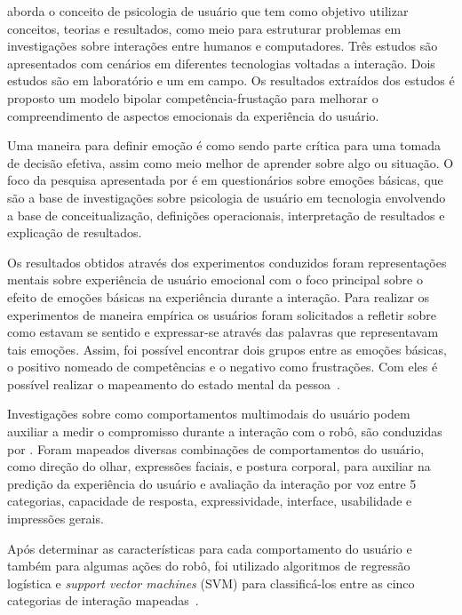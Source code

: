  aborda o conceito de psicologia de usuário que tem como objetivo utilizar conceitos, teorias e resultados, como meio para estruturar problemas em investigações sobre interações entre humanos e computadores. Três estudos são apresentados com cenários em diferentes tecnologias voltadas a interação. Dois estudos são em laboratório e um em campo. Os resultados extraídos dos estudos é proposto um modelo bipolar competência-frustação para melhorar o compreendimento de aspectos emocionais da experiência do usuário.

Uma maneira para definir emoção é como sendo parte crítica para uma tomada de decisão efetiva, assim como meio melhor de aprender sobre algo ou situação. O foco da pesquisa apresentada por  é em questionários sobre emoções básicas, que são a base de investigações sobre psicologia de usuário em tecnologia envolvendo a base de conceitualização, definições operacionais, interpretação de resultados e explicação de resultados.

Os resultados obtidos através dos experimentos conduzidos foram representações mentais sobre experiência de usuário emocional com o foco principal sobre o efeito de emoções básicas na experiência durante a interação. Para realizar os experimentos de maneira empírica os usuários foram solicitados a refletir sobre como estavam se sentido e expressar-se através das palavras que representavam tais emoções. Assim, foi possível encontrar dois grupos entre as emoções básicas, o positivo nomeado de competências e o negativo como frustrações. Com eles é possível realizar o mapeamento do estado mental da pessoa~\cite{saariluoma:2014}.

Investigações sobre como comportamentos multimodais do usuário podem auxiliar a medir o compromisso durante a interação com o robô, são conduzidas por . Foram mapeados diversas combinações de comportamentos do usuário, como direção do olhar, expressões faciais, e postura corporal, para auxiliar na predição da experiência do usuário e avaliação da interação por voz entre 5 categorias, capacidade de resposta, expressividade, interface, usabilidade e impressões gerais.

Após determinar as características para cada comportamento do usuário e também para algumas ações do robô, foi utilizado algoritmos de regressão logística e \emph{support vector machines} (SVM) para classificá-los entre as cinco categorias de interação mapeadas~\cite{jokinen:2015}.

